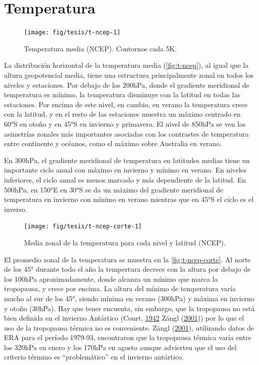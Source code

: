 \documentclass[spanish,a4paper,12pt,oneside]{book}
\begin{document}
\section{Temperatura}\label{temperatura}

\begin{landscape}\begin{figure}

{\centering \texttt{[image: fig/tesis/t-ncep-1]} 

}

\caption{Temperatura media (NCEP). Contornos cada 5K.}\label{fig:t-ncep}
\end{figure}
\end{landscape}

La distribución horizontal de la temperatura media
(\autoref{fig:t-ncep}), al igual que la altura geopotencial media, tiene
una estructura principalmente zonal en todos los niveles y estaciones.
Por debajo de los 200hPa, donde el gradiente meridional de temperatura
es mínimo, la temperatura disminuye con la latitud en todas las
estaciones. Por encima de este nivel, en cambio, en verano la
temperatura crece con la latitud, y en el resto de las estaciones
muestra un máximo centrado en 60°S en otoño y en 45°S en invierno y
primavera. El nivel de 850hPa se ven las asimetrías zonales más
importantes asociadas con los contrastes de temperatura entre continente
y océanos, como el máximo sobre Australia en verano.

En 300hPa, el gradiente meridional de temperatura en latitudes medias
tiene un importante ciclo anual con máximo en invierno y mínimo en
verano. En niveles inferiores, el ciclo anual es menos marcado y más
dependiente de la latitud. En 500hPa, en 150°E en 30°S se da un máximo
del gradiente meridional de temperatura en invierno con mínimo en verano
mientras que en 45°S el ciclo es el inverso.

\begin{figure}
\texttt{[image: fig/tesis/t-ncep-corte-1]} \caption{Media zonal de la temperatura para cada nivel y latitud (NCEP).}\label{fig:t-ncep-corte}
\end{figure}

El promedio zonal de la temperatura se muestra en la
\autoref{fig:t-ncep-corte}. Al norte de los 45° durante todo el año la
tempertura decrece con la altura por debajo de los 100hPa
aproximadamente, donde alcanza un mínimo que marca la tropopausa, y
crece por encima. La altura del mínimo de temperatura varía mucho al sur
de los 45°, siendo mínima en verano (300hPa) y máxima en invierno y
otoño (30hPa). Hay que tener encuenta, sin embargo, que la tropopausa no
está bien definida en el invierno Antártico (Court,
\protect\hyperlink{ref-Court1942}{1942} Zängl
(\protect\hyperlink{ref-Zangl2001}{2001})) por lo que el uso de la
tropopausa térmica no es conveniente. Zängl
(\protect\hyperlink{ref-Zangl2001}{2001}), utilizando datos de ERA para
el período 1979-93, encontraron que la tropopausa térmica varía entre
los 320hPa en enero y los 170hPa en agosto aunque advierten que el uso
del criterio término es ``problemático'' en el invierno antártico.
\end{document}
